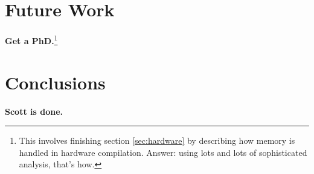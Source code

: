 \documentclass[12pt,notitlepage]{article}
\begin{document}
\section{Future Work}
\textbf{Get a PhD.}\footnote{This involves finishing section
\ref{sec:hardware} by describing how memory is handled in hardware
compilation.  Answer: using lots and lots of sophisticated analysis,
that's how.}

\section{Conclusions}
\textbf{Scott is done.}

\newpage

\appendix
\end{document}
